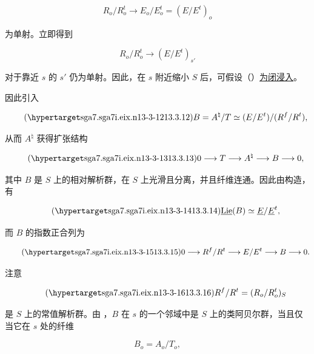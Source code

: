 \begin{equation*}
 R_o/R_o^t\longrightarrow E_o/E_o^t=(E/E^t)_o
\end{equation*}

\noindent
为单射。立即得到

\begin{equation*}
 R_o/R_o^t\longrightarrow(E/E^t)_{s'}
\end{equation*}

\noindent
对于靠近 $s$ 的 $s'$ 仍为单射。因此，在 $s$ 附近缩小 $S$ 后，可假设（）\underline{为闭浸入}。

因此引入

\begin{equation}\tag{\SGARefTarget{sga7.sga7i.eix.n13-3-12}{13.3.12}}
 B=A^\natural/T\simeq(E/E^t)/(R^f/R^t),
\end{equation}

\noindent
从而 $A^\natural$ 获得扩张结构

\begin{equation}\tag{\SGARefTarget{sga7.sga7i.eix.n13-3-13}{13.3.13}}
 0\longrightarrow T\longrightarrow A^\natural
 \longrightarrow B\longrightarrow0,
\end{equation}

\noindent
其中 $B$ 是 $S$ 上的相对解析群，在 $S$ 上光滑且分离，并且纤维连通。因此由构造，有

\begin{equation}\tag{\SGARefTarget{sga7.sga7i.eix.n13-3-14}{13.3.14}}
 \underline{\operatorname{Lie}}(B)\simeq
 \underline E/\underline E^t,
\end{equation}

\noindent
而 $B$ 的指数正合列为

\begin{equation}\tag{\SGARefTarget{sga7.sga7i.eix.n13-3-15}{13.3.15}}
 0\longrightarrow R^f/R^t\longrightarrow E/E^t
 \longrightarrow B\longrightarrow0.
\end{equation}

\noindent
注意

\begin{equation}\tag{\SGARefTarget{sga7.sga7i.eix.n13-3-16}{13.3.16}}
 R^f/R^t=(R_o/R_o^t)_S
\end{equation}

\noindent
是 $S$ 上的常值解析群。由 ，$B$ 在 $s$ 的一个邻域中是 $S$ 上的类阿贝尔群，当且仅当它在 $s$ 处的纤维

\begin{equation*}
 B_o=A_o/T_o,
\end{equation*}


